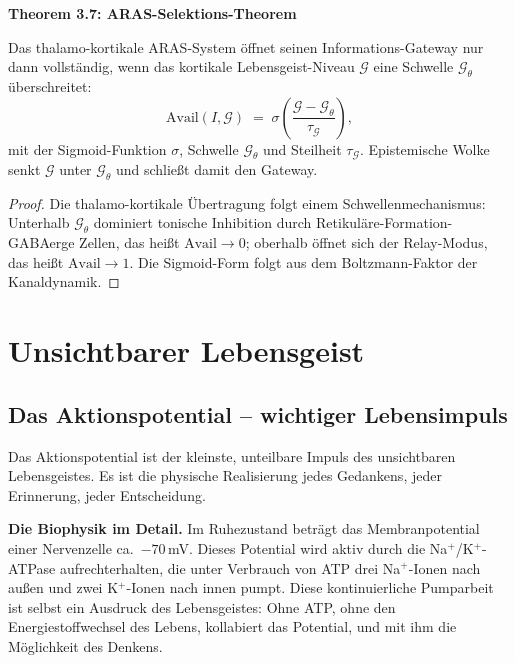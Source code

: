 ﻿\documentclass[12pt,a4paper]{report}
\theoremstyle{plain}
\theoremstyle{definition}
\theoremstyle{remark}
\begin{document}
	
	\noindent\textbf{Theorem 3.7: ARAS-Selektions-Theorem}

		\label{thm:aras}
		Das thalamo-kortikale ARAS-System öffnet seinen Informations-Gateway
		nur dann vollständig, wenn das kortikale Lebensgeist-Niveau $\mathcal{G}$
		eine Schwelle $\mathcal{G}_{\theta}$ überschreitet:
		\[
		\mathrm{Avail}(I, \mathcal{G})
		\;=\;
		\sigma\!\left(\frac{\mathcal{G} - \mathcal{G}_\theta}{\tau_\mathcal{G}}\right),
		\]
		mit der Sigmoid-Funktion $\sigma$, Schwelle $\mathcal{G}_\theta$ und
		Steilheit $\tau_\mathcal{G}$.
		Epistemische Wolke senkt $\mathcal{G}$ unter $\mathcal{G}_\theta$
		und schlie\ss{}t damit den Gateway.

	
	\begin{proof}
		Die thalamo-kortikale Übertragung folgt einem Schwellenmechanismus:
		Unterhalb $\mathcal{G}_\theta$ dominiert tonische Inhibition durch
		Retikuläre-Formation-GABAerge Zellen, das heißt $\mathrm{Avail} \to 0$;
		oberhalb öffnet sich der Relay-Modus, das heißt $\mathrm{Avail} \to 1$.
		Die Sigmoid-Form folgt aus dem Boltzmann-Faktor der Kanaldynamik. 
	\end{proof}
	
	\chapter{Unsichtbarer Lebensgeist}
	
	\section{Das Aktionspotential -- wichtiger Lebensimpuls}
	
	Das Aktionspotential ist der kleinste, unteilbare Impuls des
	unsichtbaren Lebensgeistes. Es ist die physische Realisierung jedes
	Gedankens, jeder Erinnerung, jeder Entscheidung.
	
	\textbf{Die Biophysik im Detail.}
	Im Ruhezustand beträgt das Membranpotential einer Nervenzelle
	ca.\ $-70$\,mV. Dieses Potential wird aktiv durch die
	Na$^+$/K$^+$-ATPase aufrechterhalten, die unter Verbrauch von ATP
	drei Na$^+$-Ionen nach au\ss{}en und zwei K$^+$-Ionen nach innen pumpt.
	Diese kontinuierliche Pumparbeit ist selbst ein Ausdruck des
	Lebensgeistes: Ohne ATP, ohne den Energiestoffwechsel des Lebens,
	kollabiert das Potential, und mit ihm die Möglichkeit des Denkens.
	
\end{document}
